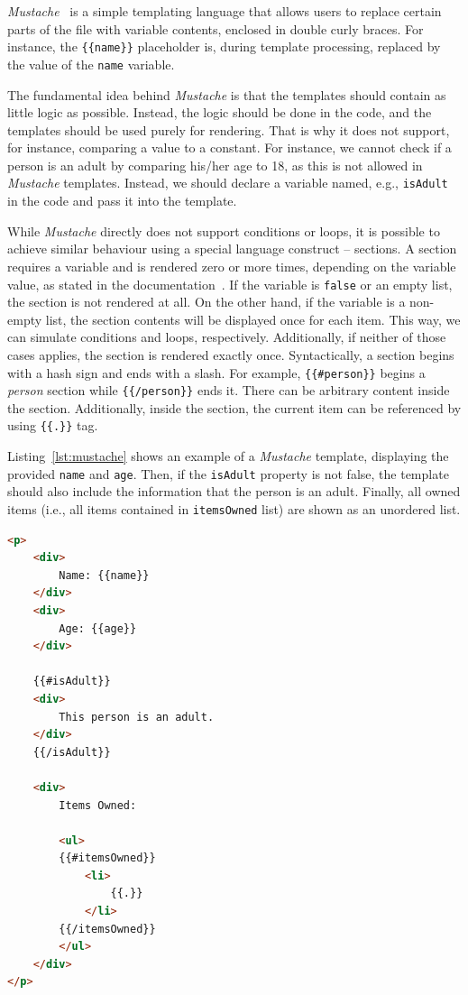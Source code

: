 \textit{Mustache}~\cite{mustache} is a simple templating language that allows users to replace certain parts of the file with variable contents, enclosed in double curly braces.
For instance, the \texttt{\{\{name\}\}} placeholder is, during template processing, replaced by the value of the \texttt{name} variable.

The fundamental idea behind \textit{Mustache} is that the templates should contain as little logic as possible.
Instead, the logic should be done in the code, and the templates should be used purely for rendering.
That is why it does not support, for instance, comparing a value to a constant. 
For instance, we cannot check if a person is an adult by comparing his/her age to 18, as this is not allowed in \textit{Mustache} templates.
Instead, we should declare a variable named, e.g., \texttt{isAdult} in the code and pass it into the template.

While \textit{Mustache} directly does not support conditions or loops, it is possible to achieve similar behaviour using a special language construct -- sections.
A section requires a variable and is rendered zero or more times, depending on the variable value, as stated in the documentation~\cite{mustache}. 
If the variable is \texttt{false} or an empty list, the section is not rendered at all.
On the other hand, if the variable is a non-empty list, the section contents will be displayed once for each item.
This way, we can simulate conditions and loops, respectively.
Additionally, if neither of those cases applies, the section is rendered exactly once.
Syntactically, a section begins with a hash sign and ends with a slash. 
For example, \texttt{\{\{\#person\}\}} begins a \textit{person} section while \texttt{\{\{/person\}\}} ends it.
There can be arbitrary content inside the section.
Additionally, inside the section, the current item can be referenced by using \texttt{\{\{.\}\}} tag.

Listing~\ref{lst:mustache} shows an example of a \textit{Mustache} template, displaying the provided \texttt{name} and \texttt{age}.
Then, if the \texttt{isAdult} property is not false, the template should also include the information that the person is an adult.
Finally, all owned items (i.e., all items contained in \texttt{itemsOwned} list) are shown as an unordered list.

\begin{listing}[H]
\begin{lstlisting}[language=HTML]
<p>
    <div>
        Name: {{name}}
    </div>
    <div>
        Age: {{age}}
    </div>
    
    {{#isAdult}}
    <div>
        This person is an adult.
    </div>
    {{/isAdult}}
    
    <div>
        Items Owned:
        
        <ul>
        {{#itemsOwned}}
            <li>
                {{.}}
            </li>
        {{/itemsOwned}}
        </ul>
    </div>
</p>
\end{lstlisting}
\caption{Example \textit{Mustache} template}
\label{lst:mustache}
\end{listing}

